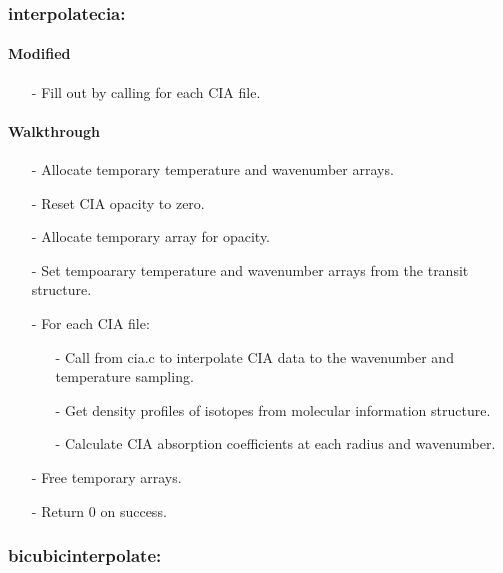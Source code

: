 \documentclass[letterpaper,12pt]{article}
\begin{document}
\subsubsection{interpolatecia:}
\paragraph{Modified}
\begin{enumerate}[leftmargin=10pt, noitemsep, parsep=0pt, topsep=0ex]
\item[-] Fill out  by calling  for each CIA file.
\end{enumerate}

\paragraph{Walkthrough}
\begin{enumerate}[leftmargin=10pt, noitemsep, parsep=0pt, topsep=0ex]
\item[-] Allocate temporary temperature and wavenumber arrays.
\item[-] Reset CIA opacity to zero.
\item[-] Allocate temporary array for opacity.
\item[-] Set tempoarary temperature and wavenumber arrays from the transit structure.
\item[-] For each CIA file:
\begin{enumerate}[leftmargin=10pt, noitemsep, parsep=0pt, topsep=0ex]
\item[-] Call  from cia.c to interpolate CIA data to the wavenumber and temperature sampling.
\item[-] Get density profiles of isotopes from molecular information structure.
\item[-] Calculate CIA absorption coefficients at each radius and wavenumber.
\end{enumerate}
\item[-] Free temporary arrays.
\item[-] Return 0 on success. 
\end{enumerate}

\subsubsection{bicubicinterpolate:}
\end{document}
